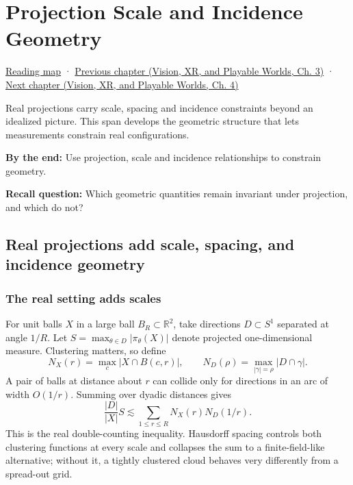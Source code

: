 \chapter{Projection Scale and Incidence Geometry}\label{04-visual-computing-ii-ch033-projection-scale-and-incidence-geometry}\hypertarget{04-visual-computing-ii-ch033}{}\label{stagechapter:04-visual-computing-ii-ch033}

\hyperref[volume-reading-map]{Reading map} · \href{../07-Vision-XR-and-Playable-Worlds/main.pdf\#nameddest=04-visual-computing-ii-ch032-pose-estimation-and-robust-fitting}{Previous chapter (Vision, XR, and Playable Worlds, Ch. 3)} · \href{../07-Vision-XR-and-Playable-Worlds/main.pdf\#nameddest=04-visual-computing-ii-ch034-learned-3d-shapes-and-scene-representations}{Next chapter (Vision, XR, and Playable Worlds, Ch. 4)}

Real projections carry scale, spacing and incidence constraints beyond an idealized picture. This span develops the geometric structure that lets measurements constrain real configurations.

\textbf{By the end:} Use projection, scale and incidence relationships to constrain geometry.

\textbf{Recall question:} Which geometric quantities remain invariant under projection, and which do not?

\section{Real projections add scale, spacing, and incidence geometry}\label{04-visual-computing-ii-ch033-real-projections-add-scale-spacing-and-incidence-geometry}

\subsection{The real setting adds scales}\label{04-visual-computing-ii-ch033-the-real-setting-adds-scales}

For unit balls \(X\) in a large ball \(B_R\subset\mathbb R^2\), take directions \(D\subset S^1\) separated at angle \(1/R\). Let \(S=\max_{\theta\in D}|\pi_\theta(X)|\) denote projected one-dimensional measure. Clustering matters, so define \[N_X(r)=\max_c|X\cap B(c,r)|,\qquad
N_D(\rho)=\max_{|\gamma|=\rho}|D\cap\gamma|.\] A pair of balls at distance about \(r\) can collide only for directions in an arc of width \(O(1/r)\). Summing over dyadic distances gives \[\frac{|D|}{|X|}S\lesssim\sum_{1\le r\le R}N_X(r)N_D(1/r).\] This is the real double-counting inequality. Hausdorff spacing controls both clustering functions at every scale and collapses the sum to a finite-field-like alternative; without it, a tightly clustered cloud behaves very differently from a spread-out grid.


